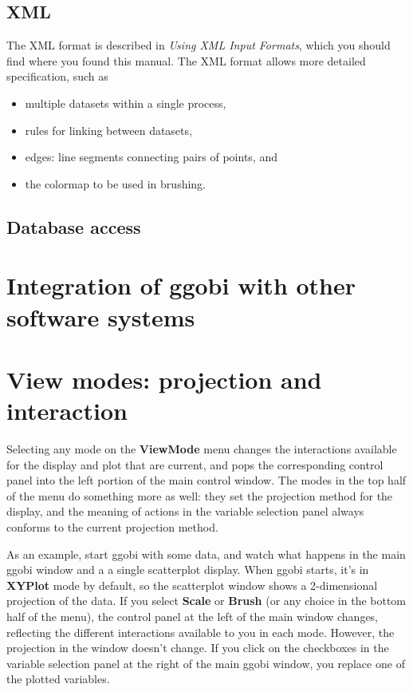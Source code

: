 \documentclass[11pt]{article}
\begin{document}
\subsection {XML}
\label{slbl:XML}

The XML format is described in {\em Using XML Input Formats},
which you should find where you found this manual.  The XML format
allows more detailed specification, such as

\begin{itemize}
\item multiple datasets within a single process,
\item rules for linking between datasets,
\item edges: line segments connecting pairs of points, and
\item the colormap to be used in brushing.
\end{itemize}

\subsection {Database access}
\label{slbl:MySQL}

\section{Integration of ggobi with other software systems}
\label{slbl:Integration}

\section{View modes: projection and interaction}
\label{slbl:ViewModes}

Selecting any mode on the {\bf ViewMode} menu changes the interactions
available for the display and plot that are current, and pops the
corresponding control panel into the left portion of the main control
window.  The modes in the top half of the menu do something more as
well:  they set the projection method for the display, and the meaning
of actions in the variable selection panel always conforms to the current
projection method.

As an example, start ggobi with some data, and watch what happens
in the main ggobi window and a a single scatterplot display.   When ggobi
starts, it's in {\bf XYPlot} mode by default, so the scatterplot window shows
a 2-dimensional projection of the data.  If you select {\bf Scale} or
{\bf Brush} (or any choice in the bottom half of the menu), the control
panel at the left of the main window changes, reflecting the different
interactions available to you in each mode.  However, the projection in
the window doesn't change.  If you click on the checkboxes in the
variable selection panel at the right of the main ggobi window, you
replace one of the plotted variables.
\end{document}
